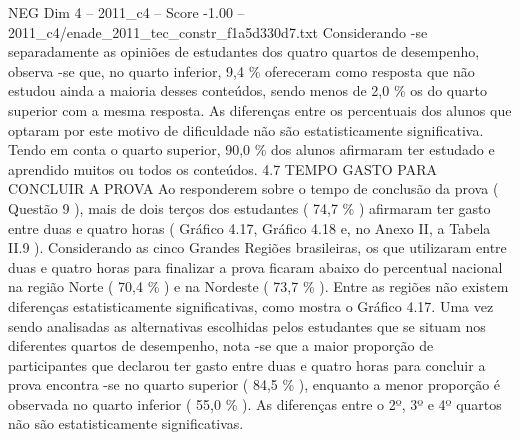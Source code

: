 \begin{textsample}{NEG Dim 4 – 2011\_c4 – Score -1.00 – 2011\_c4/enade\_2011\_tec\_constr\_f1a5d330d7.txt}
Considerando -se separadamente as opiniões de estudantes dos quatro quartos de desempenho, observa -se que, no quarto inferior, 9,4 \% ofereceram como resposta que não estudou ainda a maioria desses conteúdos, sendo menos de 2,0 \% os do quarto superior com a mesma resposta.
As diferenças entre os percentuais dos alunos que optaram por este motivo de dificuldade não são estatisticamente significativa.
Tendo em conta o quarto superior, 90,0 \% dos alunos afirmaram ter estudado e aprendido muitos ou todos os conteúdos. 4.7 TEMPO GASTO PARA CONCLUIR A PROVA Ao responderem sobre o tempo de conclusão da prova ( Questão 9 ), mais de dois terços dos estudantes ( 74,7 \% ) afirmaram ter gasto entre duas e quatro horas ( Gráfico 4.17, Gráfico 4.18 e, no Anexo II, a Tabela II.9 ).
Considerando as cinco Grandes Regiões brasileiras, os que utilizaram entre duas e quatro horas para finalizar a prova ficaram abaixo do percentual nacional na região Norte ( 70,4 \% ) e na Nordeste ( 73,7 \% ).
Entre as regiões não existem diferenças estatisticamente significativas, como mostra o Gráfico 4.17.
Uma vez sendo analisadas as alternativas escolhidas pelos estudantes que se situam nos diferentes quartos de desempenho, nota -se que a maior proporção de participantes que declarou ter gasto entre duas e quatro horas para concluir a prova encontra -se no quarto superior ( 84,5 \% ), enquanto a menor proporção é observada no quarto inferior ( 55,0 \% ).
As diferenças entre o 2º, 3º e 4º quartos não são estatisticamente significativas.

\end{textsample}
